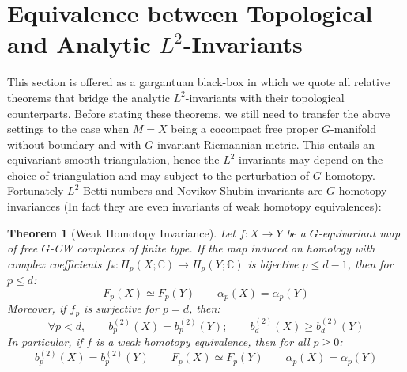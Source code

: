 \documentclass[11pt]{report}
\theoremstyle{definition}
\theoremstyle{plain}
\newtheorem{Theo}[Def]{Theorem}
\newcommand{\complex}{\mathbb{C}}
\begin{document}
\section{Equivalence between Topological and Analytic $L^2$-Invariants}
This section is offered as a gargantuan black-box in which we quote all relative theorems that bridge the analytic $L^2$-invariants with their topological counterparts. Before stating these theorems, we still need to transfer the above settings to the case when $M=X$ being a cocompact free proper $G$-manifold without boundary and with $G$-invariant Riemannian metric. This entails an equivariant smooth triangulation, hence the $L^2$-invariants may depend on the choice of triangulation and may subject to the perturbation of $G$-homotopy. Fortunately $L^2$-Betti numbers and Novikov-Shubin invariants are $G$-homotopy invariances (In fact they are even invariants of weak homotopy equivalences):
\begin{Theo}[Weak Homotopy Invariance]\label{homopty invariance}
	Let $f:X\to Y$ be a $G$-equivariant map of free $G$-CW complexes of finite type. If the map induced on homology with complex coefficients $f_*:H_p(X; \complex)\to H_p(Y; \complex)$ is bijective $p\leq d-1$, then for $p\leq d$:
	\begin{equation}
	 F_p(X)\simeq F_p(Y) \qquad \alpha_p(X)=\alpha_p(Y)
	\end{equation}
	Moreover, if $f_p$ is surjective for $p=d$, then:
	\begin{equation}
	\forall p<d,\qquad b_p^{(2)}(X)=b_p^{(2)}(Y); \qquad b_d^{(2)}(X)\geq b_d^{(2)}(Y)
	\end{equation}
	In particular, if $f$ is a weak homotopy equivalence, then for all $p\geq 0$:
	\begin{equation}
	b_p^{(2)}(X)=b_p^{(2)}(Y) \qquad F_p(X)\simeq F_p(Y) \qquad \alpha_p(X)=\alpha_p(Y)
	\end{equation}
\end{Theo}
\end{document}
